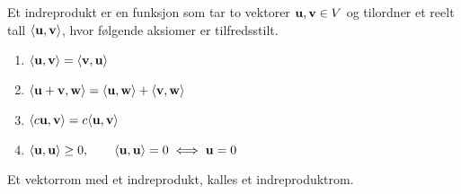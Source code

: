Et indreprodukt er en funksjon som tar to vektorer $\mathbf{u},\mathbf{v}\in V$
og tilordner et reelt tall $\langle\mathbf{u},\mathbf{v}\rangle$,
hvor følgende aksiomer er tilfredsstilt.
\begin{enumerate}
  \item $\langle\mathbf{u},\mathbf{v}\rangle = \langle\mathbf{v},\mathbf{u}\rangle$
  \item $\langle\mathbf{u}+\mathbf{v},\mathbf{w}\rangle
         = \langle\mathbf{u},\mathbf{w}\rangle + \langle\mathbf{v},\mathbf{w}\rangle$
  \item $\langle c\mathbf{u},\mathbf{v}\rangle = c\langle\mathbf{u},\mathbf{v}\rangle$
  \item $\langle\mathbf{u},\mathbf{u}\rangle \geq 0, \qquad
         \langle\mathbf{u},\mathbf{u}\rangle=0 \iff \mathbf{u}=0$
\end{enumerate}

Et vektorrom med et indreprodukt, kalles et indreproduktrom.
